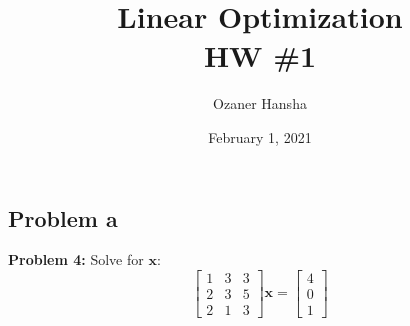 \documentclass{article}
\renewcommand\vec{\mathbf}
\begin{document}
\title{Linear Optimization\\HW \#1}
\author{Ozaner Hansha}
\date{February 1, 2021}
\maketitle

\subsection*{Problem a}
\noindent\textbf{Problem 4:} Solve for $\vec x$:
\begin{equation*}
    \begin{bmatrix}
        1&3&3\\2&3&5\\2&1&3
    \end{bmatrix}\vec x=\begin{bmatrix}
        4\\0\\1
    \end{bmatrix}
\end{equation*}
\end{document}
